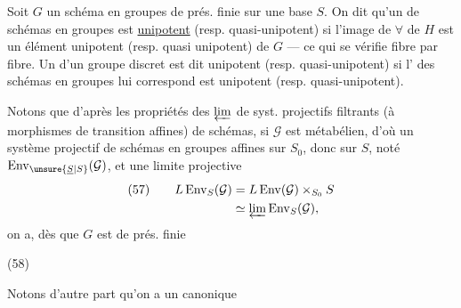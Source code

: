 Soit $G$ un schéma en groupes  de prés. finie sur une base $S$.
On dit qu'un  de schémas en groupes
est  \uline{unipotent} (resp. quasi-unipotent) si l'image de $\forall$  de $H$ est un élément unipotent (resp. quasi unipotent) de $G$ --- ce qui se vérifie fibre par fibre. Un  d'un groupe discret
est dit unipotent (resp. quasi-unipotent) si l' des schémas en groupes   lui correspond
est unipotent (resp. quasi-unipotent).



Notons que d'après les propriétés des $\varprojlim$ de syst. projectifs filtrants (à morphismes de transition affines)  de schémas, si $\mathcal{G}$ est métabélien, d'où un système projectif de schémas en groupes affines sur $S_0$, donc sur $S$, noté $\operatorname{Env}_{\unsure{\underline{S}|S}}(\mathcal{G})$, et une limite projective
\[
\begin{aligned}
(57)\qquad L\operatorname{Env}_S(\mathcal{G})
 &=L\operatorname{Env}(\mathcal{G})\times_{S_0}S\\
 &\simeq\varprojlim\operatorname{Env}_S(\mathcal{G}),
\end{aligned}
\]
on a, dès que $G$ est  de prés. finie

\begin{samepage}
(58)\quad
{}
\end{samepage}

Notons d'autre part qu'on a un   canonique

